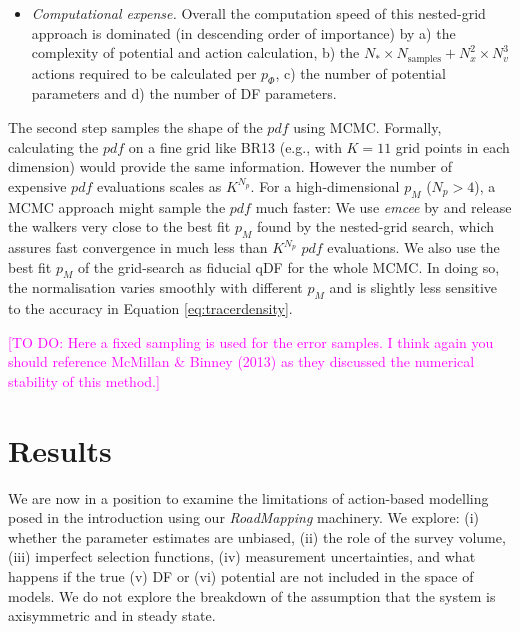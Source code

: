 \documentclass[iop,revtex4]{emulateapj}
\newcommand{\pdf}{\ensuremath{pdf}}
\newcommand{\pmodel}{\ensuremath{p_M}}
\newcommand{\RM}{{\sl RoadMapping}}
\newcommand{\Wilma}[1]{\textcolor{Magenta}{#1}}
\begin{document}
\begin{itemize}
\item \emph{Computational expense.} Overall the computation speed of this nested-grid approach is dominated (in descending order of importance) by a) the complexity of potential and action calculation, b) the $N_* \times N_\text{samples} + N_x^2 \times N_v^3$ actions required to be calculated per $p_\Phi$, c) the number of potential parameters and d) the number of DF parameters.
\end{itemize}

The second step samples the shape of the \pdf{} using MCMC. Formally, calculating the \pdf{} on a fine grid like BR13 (e.g., with $K=11$ grid points in each dimension) would provide the same information. However the number of expensive \pdf{} evaluations scales as $K^{N_p}$. For a high-dimensional \pmodel{} ($N_p>4$), a MCMC approach might sample the \pdf{} much faster: We use \emph{emcee} by \citet{2013PASP..125..306F} and release the walkers very close to the best fit \pmodel{} found by the nested-grid search, which assures fast convergence in much less than $K^{N_p}$ \pdf{} evaluations. We also use the best fit \pmodel{} of the grid-search as fiducial qDF for the whole MCMC. In doing so, the normalisation varies smoothly with different $\pmodel{}$ and is slightly less sensitive to the accuracy in Equation \eqref{eq:tracerdensity}.

\Wilma{[TO DO: Here a fixed sampling is used for the error samples. I think again you should reference McMillan \& Binney (2013) as they discussed the numerical stability of this method.]}

\section{Results} \label{sec:results}

We are now in a position to examine the limitations of action-based modelling posed in the introduction using our \RM{} machinery. We explore: (i) whether the parameter estimates are unbiased, (ii) the role of the survey volume, (iii) imperfect selection functions, (iv) measurement uncertainties, and what happens if the true (v) DF or (vi) potential are not included in the space of models. We do not explore the breakdown of the assumption that the system is axisymmetric and in steady state.
\end{document}
